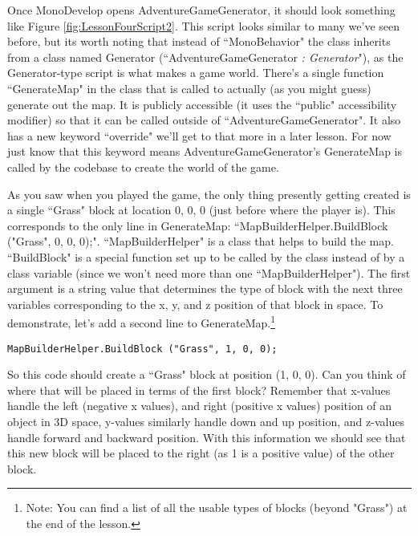 \documentclass{article}
\begin{document}
Once MonoDevelop opens AdventureGameGenerator, it should look something like Figure \ref{fig:LessonFourScript2}. This script looks similar to many we've seen before, but its worth noting that instead of ``MonoBehavior" the class inherits from a class named Generator (``AdventureGameGenerator \textit{: Generator}"), as the Generator-type script is what makes a game world. There's a single function ``GenerateMap" in the class that is called to actually (as you might guess) generate out the map. It is publicly accessible (it uses the ``public" accessibility modifier) so that it can be called outside of ``AdventureGameGenerator". It also has a new keyword ``override" we'll get to that more in a later lesson. For now just know that this keyword means AdventureGameGenerator's GenerateMap is called by the codebase to create the world of the game. 

As you saw when you played the game, the only thing presently getting created is a single ``Grass" block at location 0, 0, 0 (just before where the player is). This corresponds to the only line in GenerateMap: ``MapBuilderHelper.BuildBlock ("Grass", 0, 0, 0);". ``MapBuilderHelper" is a class that helps to build the map. ``BuildBlock" is a special function set up to be called by the class instead of by a class variable (since we won't need more than one ``MapBuilderHelper"). The first argument is a string value that determines the type of block with the next three variables corresponding to the x, y, and z position of that block in space. To demonstrate, let's add a second line to GenerateMap.\footnote{Note: You can find a list of all the usable types of blocks (beyond "Grass") at the end of the lesson.}

\lstset{style=sharpc}
\begin{lstlisting}
MapBuilderHelper.BuildBlock ("Grass", 1, 0, 0);
\end{lstlisting} 

So this code should create a ``Grass" block at position (1, 0, 0). Can you think of where that will be placed in terms of the first block? Remember that x-values handle the left (negative x values), and right (positive x values) position of an object in 3D space, y-values similarly handle down and up position, and z-values handle forward and backward position. With this information we should see that this new block will be placed to the right (as 1 is a positive value) of the other block.

\noindent{}
\end{document}
